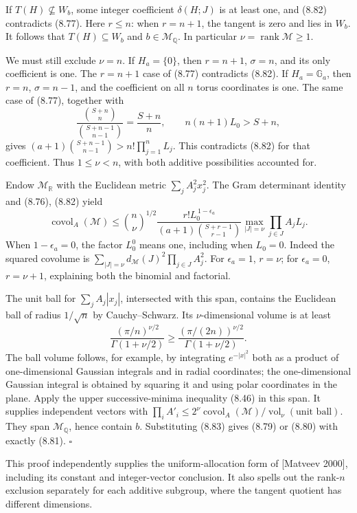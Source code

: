 \documentclass[
  11pt,
  a4paper,
]{article}
\begin{document}
If \(T(H)\not\subseteq W_b\), some integer coefficient \(\delta(H;J)\)
is at least one, and (8.82) contradicts (8.77). Here \(r\le n\): when
\(r=n+1\), the tangent is zero and lies in \(W_b\). It follows that
\(T(H)\subseteq W_b\) and \(b\in\mathcal M_{\mathbb Q}\). In particular
\(\nu=\operatorname{rank}\mathcal M\ge1\).

We must still exclude \(\nu=n\). If \(H_a=\{0\}\), then \(r=n+1\),
\(\sigma=n\), and its only coefficient is one. The \(r=n+1\) case of
(8.77) contradicts (8.82). If \(H_a=\mathbb G_a\), then \(r=n\),
\(\sigma=n-1\), and the coefficient on all \(n\) torus coordinates is
one. The same case of (8.77), together with \[
\frac{\binom{S+n}{n}}{\binom{S+n-1}{n-1}}=\frac{S+n}{n},
\qquad n(n+1)L_0>S+n,
\] gives \((a+1)\binom{S+n-1}{n-1}>n!\prod_{j=1}^nL_j\). This
contradicts (8.82) for that coefficient. Thus \(1\le\nu<n\), with both
additive possibilities accounted for.

Endow \(\mathcal M_{\mathbb R}\) with the Euclidean metric
\(\sum_jA_j^2x_j^2\). The Gram determinant identity and (8.76), (8.82)
yield \[
\operatorname{covol}_A(\mathcal M)
\le\binom n\nu^{1/2}
\frac{r!L_0^{\,1-\epsilon_a}}
{(a+1)\binom{S+r-1}{r-1}}
\max_{|J|=\nu}\prod_{j\in J}A_jL_j.
\tag{8.83}
\] When \(1-\epsilon_a=0\), the factor \(L_0^0\) means one, including
when \(L_0=0\). Indeed the squared covolume is
\(\sum_{|J|=\nu}d_{\mathcal M}(J)^2\prod_{j\in J}A_j^2\). For
\(\epsilon_a=1\), \(r=\nu\); for \(\epsilon_a=0\), \(r=\nu+1\),
explaining both the binomial and factorial.

The unit ball for \(\sum_jA_j|x_j|\), intersected with this span,
contains the Euclidean ball of radius \(1/\sqrt n\) by Cauchy--Schwarz.
Its \(\nu\)-dimensional volume is at least \[
\frac{(\pi/n)^{\nu/2}}{\Gamma(1+\nu/2)}
\ge\frac{(\pi/(2n))^{\nu/2}}{\Gamma(1+\nu/2)}.
\] The ball volume follows, for example, by integrating \(e^{-|x|^2}\)
both as a product of one-dimensional Gaussian integrals and in radial
coordinates; the one-dimensional Gaussian integral is obtained by
squaring it and using polar coordinates in the plane. Apply the upper
successive-minima inequality (8.46) in this span. It supplies
independent vectors with \(\prod_iA'_i\le
2^\nu\operatorname{covol}_A(\mathcal M)/
\operatorname{vol}_\nu(\text{unit ball})\). They span
\(\mathcal M_{\mathbb Q}\), hence contain \(b\). Substituting (8.83)
gives (8.79) or (8.80) with exactly (8.81). \(\square\)

This proof independently supplies the uniform-allocation form of
{[}Matveev 2000{]}, including its constant and integer-vector
conclusion. It also spells out the rank-\(n\) exclusion separately for
each additive subgroup, where the tangent quotient has different
dimensions.
\end{document}
